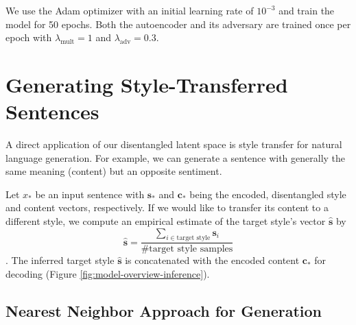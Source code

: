 We use the Adam optimizer \citep{kingma2014adam} with an initial learning rate of $10^{-3}$ and train the model for 50 epochs. Both the autoencoder and its adversary are trained once per epoch with $\lambda_\text{mult} = 1$ and $\lambda_\text{adv} = 0.3$.


\section{Generating Style-Transferred Sentences} \label{ssec:generating-novel-text}

A direct application of our disentangled latent space is style transfer for natural language generation. For example, we can generate a sentence with generally the same meaning (content) but an opposite sentiment.

Let $x_*$ be an input sentence with $\bm s_*$ and $\bm c_*$ being the encoded, disentangled style and content vectors, respectively. If we would like to transfer its content to a different style, we compute an empirical estimate of the target style's vector $\hat{\bm s}$ by
$$\hat{\bm s}=\frac{\sum_{i\in\text{target style}}\bm s_i}{\text{\# target style samples}}$$. The inferred target style $\hat{\bm s}$ is concatenated with the encoded content $\bm c_*$ for decoding (Figure \ref{fig:model-overview-inference}).


\subsection{Nearest Neighbor Approach for Generation}
